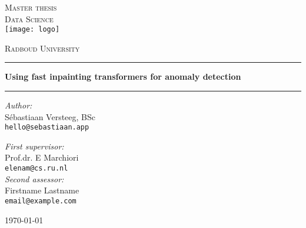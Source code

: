 \documentclass[11pt,a4paper]{report}
\begin{document}
\begin{titlepage}
\begin{center}
\textsc{\LARGE Master thesis\\Data Science}\\[.4cm]
\texttt{[image: logo]}

\vspace{0.4cm}
\textsc{\Large Radboud University}\\[2cm]
\hrule
\vspace{0.4cm}
\textbf{\huge Using fast inpainting transformers for anomaly detection\\[0.3cm]
\LARGE  
}
\hrule
\vspace{2cm}
\begin{minipage}[t]{0.45\textwidth}
\begin{flushleft} \large
\textit{Author:}\\
Sébastiaan Versteeg, BSc\\
\texttt{hello@sebastiaan.app}
\end{flushleft}
\end{minipage}
\begin{minipage}[t]{0.45\textwidth}
\begin{flushright} \large
\textit{First supervisor:}\\
Prof.dr. E Marchiori\\
\texttt{elenam@cs.ru.nl}\\[1.3cm]
\textit{Second assessor:}\\
Firstname Lastname\\
\texttt{email@example.com}
\end{flushright}
\end{minipage}
\vfill
{\large \today}
\end{center}
\end{titlepage}



\tableofcontents












\appendix


\newpage
\listoftodos[Notes]
\end{document}
